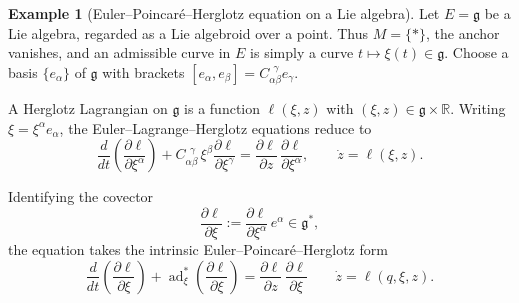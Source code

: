 \documentclass[11pt,a4paper]{article}
\theoremstyle{definition}
\newtheorem{example}[theorem]{Example}
\begin{document}
\begin{example}[Euler--Poincar\'e--Herglotz equation on a Lie algebra]

Let $E=\mathfrak{g}$ be a Lie algebra, regarded as a Lie algebroid over a point.
Thus $M=\{\ast\}$, the anchor vanishes, and an admissible curve in $E$ is simply
a curve $t \mapsto \xi(t) \in \mathfrak{g}$. Choose a basis $\{e_\alpha\}$ of $\mathfrak{g}$ with brackets
$[e_\alpha,e_\beta]=C_{\alpha\beta}^{\ \ \gamma}e_\gamma$.

A Herglotz Lagrangian on $\mathfrak{g}$ is a function
$\ell(\xi,z)$ with $(\xi,z)\in \mathfrak{g}\times\mathbb{R}$. Writing $\xi=\xi^\alpha e_\alpha$, the
Euler--Lagrange--Herglotz equations reduce to
\[
\frac{d}{dt}\!\left(\frac{\partial \ell}{\partial \xi^\alpha}\right)
+ C_{\alpha\beta}^{\ \ \gamma}\,\xi^\beta 
   \frac{\partial \ell}{\partial \xi^\gamma}
= 
\frac{\partial \ell}{\partial z}\,
   \frac{\partial \ell}{\partial \xi^\alpha},
\qquad
\dot z = \ell(\xi,z).
\]

Identifying the covector 
\[
\frac{\partial \ell}{\partial \xi}
:= \frac{\partial \ell}{\partial \xi^\alpha}\,e^{\alpha}
\in \mathfrak{g}^*,
\]
the equation takes the intrinsic Euler--Poincar\'e--Herglotz form \cite{anahory2024reduction}
\[
\frac{d}{dt}\left(\frac{\partial \ell}{\partial \xi}\right)
+ \operatorname{ad}^*_{\xi}\!\left(\frac{\partial \ell}{\partial \xi}\right)
= 
\frac{\partial \ell}{\partial z}\,
\frac{\partial \ell}{\partial \xi}\qquad
\dot z = \ell(q,\xi,z).
\]


\end{example}
\end{document}
